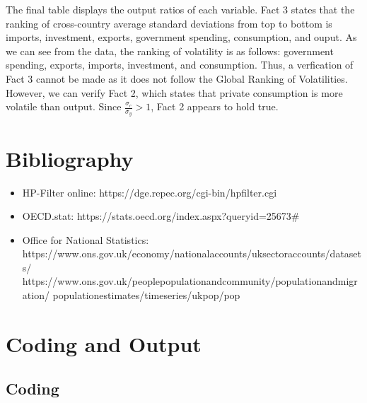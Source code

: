 \documentclass[12pt]{article}
\begin{document}
\begin{flushleft}
The final table displays the output ratios of each variable. Fact 3 states that the ranking of cross-country average standard deviations from top to bottom is imports, investment, exports, government spending, consumption, and ouput. As we can see from the data, the ranking of volatility is as follows: government spending, exports, imports, investment, and consumption. Thus, a verfication of Fact 3 cannot be made as it does not follow the Global Ranking of Volatilities.
\break
\linebreak
However, we can verify Fact 2, which states that private consumption is more volatile than output. Since $\frac{\sigma_{c}}{\sigma_{y}}>1$, Fact 2 appears to hold true.
\end{flushleft}

\newpage

\section{Bibliography}

\begin{flushleft}
\begin{itemize}
\item HP-Filter online:
\break
https://dge.repec.org/cgi-bin/hpfilter.cgi
\item OECD.stat:
\break
https://stats.oecd.org/index.aspx?queryid=25673\#
\item Office for National Statistics:
\break
https://www.ons.gov.uk/economy/nationalaccounts/uksectoraccounts/datasets/
https://www.ons.gov.uk/peoplepopulationandcommunity/populationandmigration/
populationestimates/timeseries/ukpop/pop
\end{itemize}
\end{flushleft}

\newpage

\section{Coding and Output}

\subsection{Coding}
\end{document}
